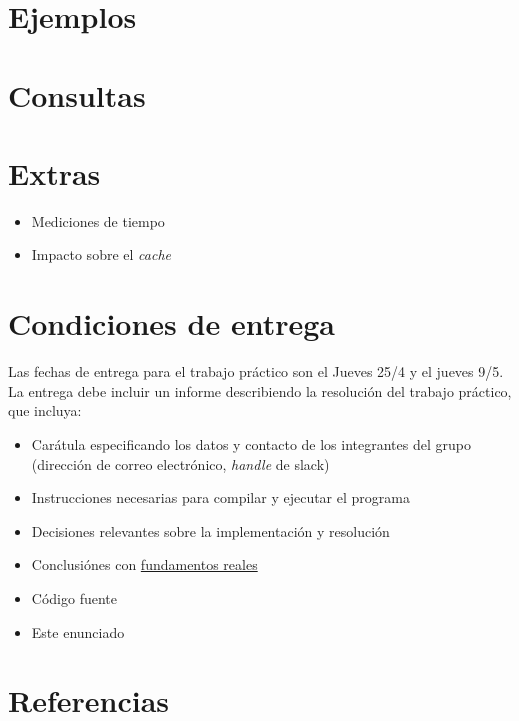 \documentclass{article}
\begin{document}
\section{Ejemplos}

\section{Consultas}

\section{Extras}
\begin{itemize}
\item Mediciones de tiempo
\item Impacto sobre el \textit{cache}
\end{itemize}

\section{Condiciones de entrega}
Las fechas de entrega para el trabajo práctico son el Jueves 25/4 y el jueves 9/5. La entrega debe incluir un informe
describiendo la resolución del trabajo práctico, que incluya:

\begin{itemize}
\item Carátula especificando los datos y contacto de los integrantes del grupo (dirección de correo electrónico, \textit{handle} de slack)
\item Instrucciones necesarias para compilar y ejecutar el programa
\item Decisiones relevantes sobre la implementación y resolución
\item Conclusiónes con \underline{fundamentos reales}
\item Código fuente
\item Este enunciado
\end{itemize}

\section{Referencias}
\end{document}

